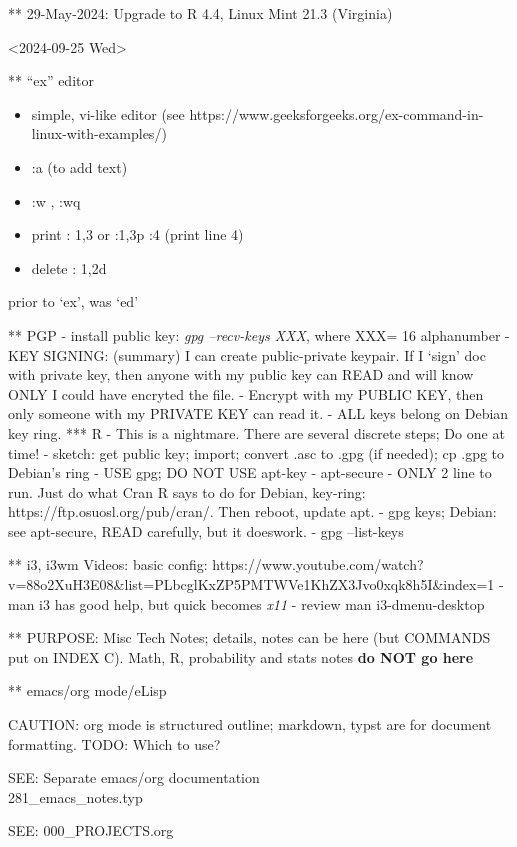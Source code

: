 \documentclass[
  letterpaper,
  DIV=11,
  numbers=noendperiod]{scrartcl}
\providecommand{\tightlist}{%
  \setlength{\itemsep}{0pt}\setlength{\parskip}{0pt}}\usepackage{longtable,booktabs,array}
\begin{document}
** 29-May-2024: Upgrade to R 4.4, Linux Mint 21.3 (Virginia)

\textless2024-09-25 Wed\textgreater{}

** ``ex'' editor

\begin{itemize}
\tightlist
\item
  simple, vi-like editor (see
  https://www.geeksforgeeks.org/ex-command-in-linux-with-examples/)
\item
  :a (to add text)
\item
  :w , :wq
\item
  print : 1,3 or :1,3p :4 (print line 4)
\item
  delete : 1,2d
\end{itemize}

prior to `ex', was `ed'

** PGP - install public key: \emph{gpg --recv-keys XXX}, where XXX= 16
alphanumber - KEY SIGNING: (summary) I can create public-private
keypair. If I `sign' doc with private key, then anyone with my public
key can READ and will know ONLY I could have encryted the file. -
Encrypt with my PUBLIC KEY, then only someone with my PRIVATE KEY can
read it. - ALL keys belong on Debian key ring. *** R - This is a
nightmare. There are several discrete steps; Do one at time! - sketch:
get public key; import; convert .asc to .gpg (if needed); cp .gpg to
Debian's ring - USE gpg; DO NOT USE apt-key - apt-secure - ONLY 2 line
to run. Just do what Cran R says to do for Debian, key-ring:
https://ftp.osuosl.org/pub/cran/. Then reboot, update apt. - gpg keys;
Debian: see apt-secure, READ carefully, but it doeswork. - gpg
--list-keys

** i3, i3wm Videos: basic config:
https://www.youtube.com/watch?v=88o2XuH3E08\&list=PLbcglKxZP5PMTWVe1KhZX3Jvo0xqk8h5I\&index=1
- man i3 has good help, but quick becomes \emph{x11} - review man
i3-dmenu-desktop

** PURPOSE: Misc Tech Notes; details, notes can be here (but COMMANDS
put on INDEX C). Math, R, probability and stats notes \textbf{do NOT go
here}

** emacs/org mode/eLisp

CAUTION: org mode is structured outline; markdown, typst are for
document formatting. TODO: Which to use?

SEE: Separate emacs/org documentation\\
281\_emacs\_notes.typ

SEE: 000\_PROJECTS.org
\end{document}
